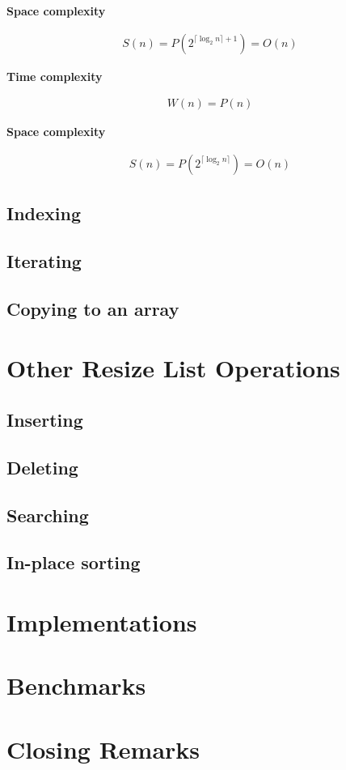 \documentclass{article}
\newcommand{\tcomplex}{\textbf{Time complexity}}
\newcommand{\scomplex}{\textbf{Space complexity}}
\newcommand{\spacefn}{S}
\newcommand{\nwritesfn}{W}
\newcommand{\bigo}{O}
\newcommand{\biggo}{P}
\newcommand{\varnitems}{n}
\begin{document}
	\scomplex
	
	\begin{align*}
	\spacefn(\varnitems) = \biggo(2^{\lceil \log_2 \varnitems \rceil + 1}) = \bigo(\varnitems)
	\end{align*}
	
	
	\tcomplex
	
	\begin{align*}
	\nwritesfn(\varnitems) = \biggo(\varnitems)
	\end{align*}
	
	\scomplex
	
	\begin{align*}
	\spacefn(\varnitems) = \biggo(2^{\lceil \log_2 \varnitems \rceil}) = \bigo(\varnitems)
	\end{align*}
	
	\subsection{Indexing}
	
	\subsection{Iterating}
	
	\subsection{Copying to an array}
	
	\section{Other Resize List Operations}
	
	\subsection{Inserting}
	
	\subsection{Deleting}
	
	\subsection{Searching}
	
	\subsection{In-place sorting}
	
	\section{Implementations}
	
	\section{Benchmarks}
	
	\section{Closing Remarks}
\end{document}
